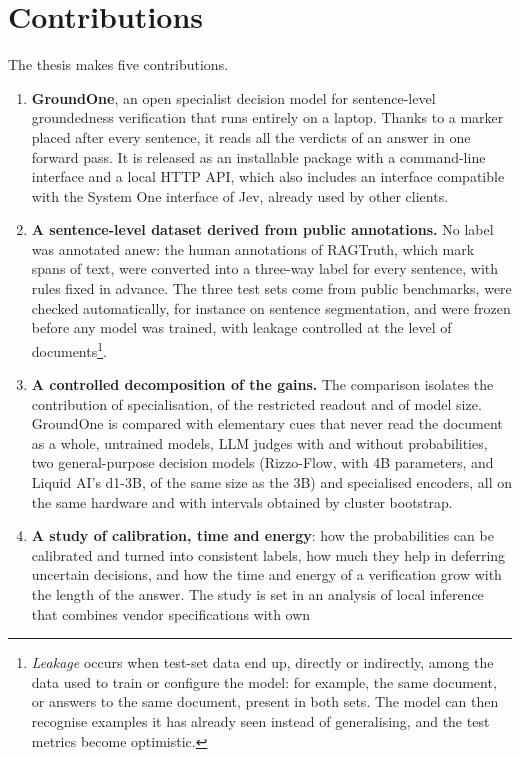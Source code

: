 \section{Contributions}
\label{sec:intro-contributions}

The thesis makes five contributions.
\begin{enumerate}
\item \textbf{GroundOne}, an open specialist decision model for sentence-level groundedness verification that runs entirely
on a laptop. Thanks to a marker placed after every sentence, it reads all the verdicts of an answer in one forward pass.
It is released as an installable package with a command-line interface and a local HTTP API, which also includes an
interface compatible with the System One interface of Jev, already used by other clients.
\item \textbf{A sentence-level dataset derived from public annotations.} No label was annotated anew: the human
annotations of RAGTruth, which mark spans of text, were converted into a three-way label for every sentence, with rules
fixed in advance. The three test sets come from public benchmarks, were checked automatically, for instance on sentence
segmentation, and were frozen before any model was trained, with leakage controlled at the level of documents\footnote{\emph{Leakage} occurs when test-set data end up, directly
or indirectly, among the data used to train or configure the model: for example, the same document, or answers to the
same document, present in both sets. The model can then recognise examples it has already seen instead of generalising,
and the test metrics become optimistic.}.
\item \textbf{A controlled decomposition of the gains.} The comparison isolates the contribution of specialisation, of the
restricted readout and of model size. GroundOne is compared with elementary cues that never read the document as a whole, untrained models,
LLM judges with and without probabilities, two general-purpose decision models (Rizzo-Flow, with 4B
parameters, and Liquid AI's d1-3B, of the same size as the 3B) and specialised encoders, all on the same hardware and with intervals obtained by cluster bootstrap.
\item \textbf{A study of calibration, time and energy}: how the probabilities can be calibrated and turned into consistent
labels, how much they help in deferring uncertain decisions, and how the time and energy of a verification grow with the
length of the answer. The study is set in an analysis of local inference that combines vendor specifications with own

\end{enumerate}
